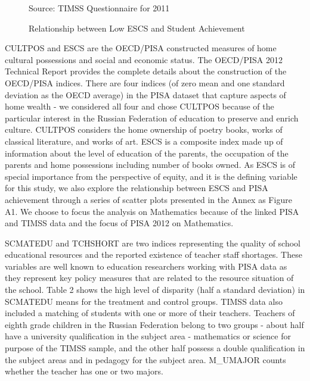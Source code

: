 \documentclass[alpha-refs,fleqn]{wiley-article_p2}
\begin{document}
\begin{group} 
\centering
\begin{figure}[htb]
\begin{subfigure}[Panel A. STUCONF]{
\texttt{[image: tq1.png]}}
\end{subfigure}
\begin{subfigure}[Panel B. STUOUTLK]{
\texttt{[image: tq2.png]}}
\end{subfigure}
\footnotesize{Source: TIMSS Questionnaire for 2011}
\caption{Relationship between Low ESCS and Student Achievement}\label{fig:1}
\end{figure}
\end{group} 

CULTPOS and ESCS are the OECD/PISA constructed measures of home cultural possessions and social and economic status. The OECD/PISA 2012 Technical Report provides the complete details about the construction of the OECD/PISA indices. There are four indices (of zero mean and one standard deviation as the OECD average) in the PISA dataset that capture aspects of home wealth - we considered all four and chose CULTPOS because of the particular interest in the Russian Federation of education to preserve and enrich culture. CULTPOS considers the home ownership of poetry books, works of classical literature, and works of art. ESCS is a composite index made up of information about the level of education of the parents, the occupation of the parents and home possessions including number of books owned. As ESCS is of special importance from the perspective of equity, and it is the defining variable for this study, we also explore the relationship between ESCS and PISA achievement through a series of scatter plots presented in the Annex as Figure A1. We choose to focus the analysis on Mathematics because of the linked PISA and TIMSS data and the focus of PISA 2012 on Mathematics. 

SCMATEDU and TCHSHORT are two indices representing the quality of school educational resources and the reported existence of teacher staff shortages. These variables are well known to education researchers working with PISA data as they represent key policy measures that are related to the resource situation of the school. Table 2 shows the high level of disparity (half a standard deviation) in SCMATEDU means for the treatment and control groups. TIMSS data also included a matching of students with one or more of their teachers. Teachers of eighth grade children in the Russian Federation belong to two groups - about half have a university  qualification in the subject area - mathematics or science for purpose of the TIMSS sample, and the other half possess a double qualification in the subject areas and in pedagogy for the subject area. M\_UMAJOR counts whether the teacher has one or two majors. 
\end{document}
